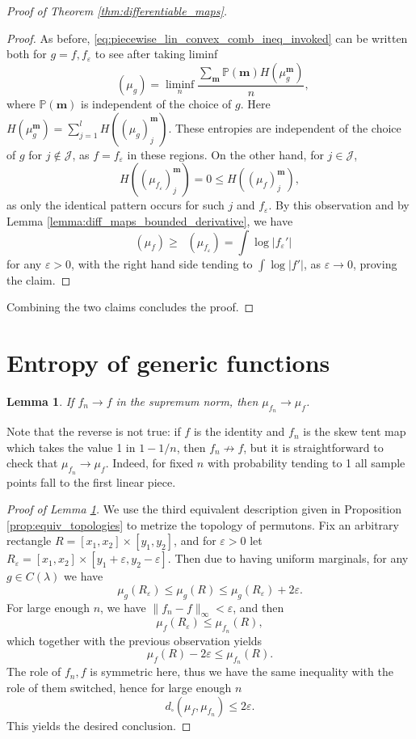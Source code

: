 \documentclass[11pt]{article}
\newcommand{\lowerlinent}{\mathop{\underline{H}^{\mathrm{lin}}}}
\newtheorem{lemma}[theorem]{Lemma}
\theoremstyle{definition}
\begin{document}
\begin{proof}[Proof of Theorem \ref{thm:differentiable_maps}]
\begin{proof}
    As before, \eqref{eq:piecewise_lin_convex_comb_ineq_invoked} can be written both for $g=f, f_{\varepsilon}$ to see after taking liminf
    $$\lowerlinent(\mu_g)= \liminf_n \frac{\sum_{\mathbf{m}}\mathbb{P}(\mathbf{m})H(\mu_g^{\mathbf{m}})}{n},$$
    where $\mathbb{P}(\mathbf{m})$ is independent of the choice of $g$. Here $H(\mu_g^{\mathbf{m}})=\sum_{j=1}^{l} H((\mu_g)_j^{\mathbf{m}})$. These entropies are independent of the choice of $g$ for $j\notin \mathcal{J}$, as $f=f_{\varepsilon}$ in these regions. On the other hand, for $j\in \mathcal{J}$, $$H((\mu_{f_{\varepsilon}})_j^{\mathbf{m}})=0\leq H((\mu_f)_j^{\mathbf{m}}),$$ as only the identical pattern occurs for such $j$ and $f_{\varepsilon}$. By this observation and by Lemma \ref{lemma:diff_maps_bounded_derivative}, we have
    $$\lowerlinent(\mu_f)\geq \lowerlinent(\mu_{f_\varepsilon})=\int \log |f_{\varepsilon}'|$$
    for any $\varepsilon>0$, with the right hand side tending to $\int \log |f'|$, as $\varepsilon\to 0$, proving the claim.
    \end{proof}
    Combining the two claims concludes the proof.
    
\end{proof}


\section{Entropy of generic functions} \label{sec:generic}

\begin{lemma} \label{lemma:supremum_conv_yields_permuton_conv}
    If $f_n\to f$ in the supremum norm, then $\mu_{f_n}\to \mu_f$.
\end{lemma}

Note that the reverse is not true: if $f$ is the identity and $f_n$ is the skew tent map which takes the value 1 in $1-1/n$, then $f_n\nrightarrow f$, but it is straightforward to check that $\mu_{f_n}\to \mu_f$. Indeed, for fixed $n$ with probability tending to 1 all sample points fall to the first linear piece.

\begin{proof}[Proof of Lemma \ref{lemma:supremum_conv_yields_permuton_conv}]
    We use the third equivalent description given in Proposition \ref{prop:equiv_topologies} to metrize the topology of permutons. Fix an arbitrary rectangle $R=[x_1, x_2]\times [y_1, y_2]$, and for $\varepsilon>0$ let $R_\varepsilon = [x_1, x_2]\times [y_1+\varepsilon, y_2-\varepsilon]$. Then due to having uniform marginals, for any $g\in C(\lambda)$ we have
    $$\mu_g(R_\varepsilon)\leq \mu_g(R)\leq \mu_g(R_\varepsilon)+2\varepsilon.$$
    For large enough $n$, we have $\|f_n - f\|_{\infty}< \varepsilon$, and then
    $$\mu_f(R_\varepsilon)\leq \mu_{f_n}(R),$$
    which together with the previous observation yields
    $$\mu_f(R)-2\varepsilon \leq \mu_{f_n}(R).$$
    The role of $f_n, f$ is symmetric here, thus we have the same inequality with the role of them switched, hence for large enough $n$
    $$d_{\square}(\mu_f, \mu_{f_n})\leq 2\varepsilon.$$
    This yields the desired conclusion.
\end{proof}
\end{document}
